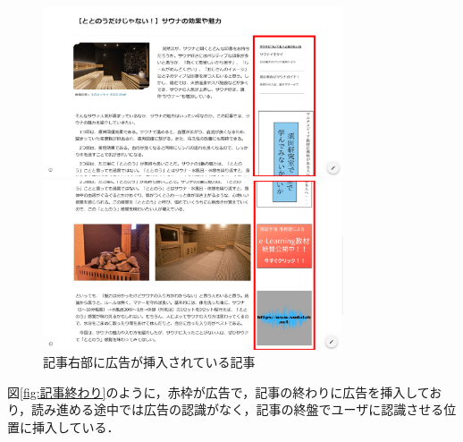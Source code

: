 \documentclass[12pt,a4j,titlepage]{ltjsarticle}
\begin{document}
\begin{figure}[H]
  \begin{minipage}[b]{0.50\linewidth}
    \centering
    \includegraphics[height=50mm]{figures/記事右部_1.pdf}
  \end{minipage}
  \begin{minipage}[b]{0.50\linewidth}
    \centering
    \includegraphics[height=50mm]{figures/記事右部_2.pdf}
  \end{minipage}
   \caption{記事右部に広告が挿入されている記事}
    \label{fig:記事右部}
\end{figure}

図\ref{fig:記事終わり}のように，赤枠が広告で，記事の終わりに広告を挿入しており，読み進める途中では広告の認識がなく，記事の終盤でユーザに認識させる位置に挿入している．
\end{document}
